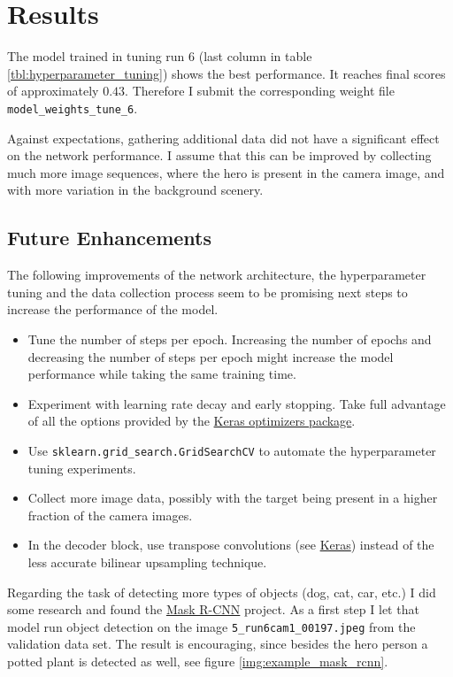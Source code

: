 \documentclass[11pt, onecolumn, oneside, reqno]{article}
\begin{document}
{{{{\section{Results}
The model trained in tuning run $6$ (last column in table \ref{tbl:hyperparameter_tuning}) shows the best performance. It reaches final scores of approximately $0.43$. Therefore I submit the corresponding weight file \texttt{model\_weights\_tune\_6}.

Against expectations, gathering additional data did not have a significant effect on the network performance. I assume that this can be improved by collecting much more image sequences, where the hero is present in the camera image, and with more variation in the background scenery.

\subsection{Future Enhancements}
The following improvements of the network architecture, the hyperparameter tuning and the data collection process seem to be promising next steps to increase the performance of the model.
\begin{itemize}
\item Tune the number of steps per epoch. Increasing the number of epochs and decreasing the number of steps per epoch might increase the model performance while taking the same training time.
\item Experiment with learning rate decay and early stopping. Take full advantage of all the options provided by the \href{https://keras.io/optimizers/}{Keras optimizers package}.
\item Use \texttt{sklearn.grid\_search.GridSearchCV} to automate the hyperparameter tuning experiments.
\item Collect more image data, possibly with the target being present in a higher fraction of the camera images.
\item In the decoder block, use transpose convolutions (see \href{https://keras.io/layers/convolutional/#conv2dtranspose}{Keras}) instead of the less accurate bilinear upsampling technique.
\end{itemize}

Regarding the task of detecting more types of objects (dog, cat, car, etc.) I did some research and found the \href{https://github.com/matterport/Mask_RCNN}{Mask R-CNN} project. As a first step I let that model run object detection on the image \texttt{5\_run6cam1\_00197.jpeg} from the validation data set. The result is encouraging, since besides the hero person a potted plant is detected as well, see figure \ref{img:example_mask_rcnn}.

}}}}
\end{document}
